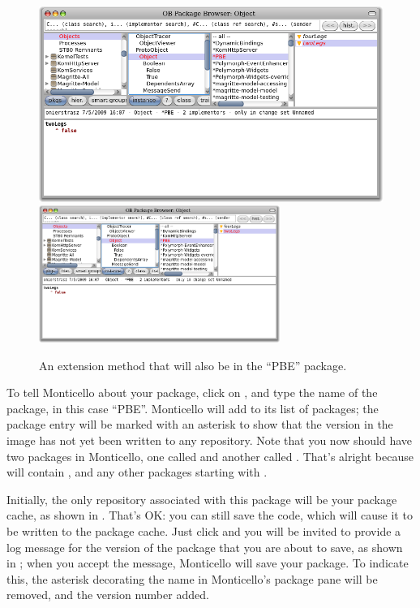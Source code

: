 \documentclass[a4paper,10pt,twoside]{book}
\begin{document}
\begin{figure}[btp]
	\begin{center}
	\ifluluelse
		{\includegraphics[width=\textwidth]{MCnewmethod}}
		{\includegraphics[width=0.7\textwidth]{MCnewmethod}}
	\end{center}
	\caption{An extension method that will also be in the ``PBE'' package.}
\end{figure}

To tell Monticello about your package, click on , and type the name of the package, in this case ``PBE''.  Monticello will add  to its list of packages; the package entry will be marked with an asterisk to show that the version in the image has not yet been written to any repository. Note that you now should have two packages in Monticello, one called  and another called . That's alright because  will contain , and any other packages starting with .

Initially, the only repository associated with this package will be your package cache, as shown in .  That's OK: you can still save the code, which will cause it to be written to the package cache.  
Just click  and you will be invited to provide a log message for the version of the package that you are about to save, as shown in ; when you accept the message, Monticello will save your package.
To indicate this, the asterisk decorating the name in Monticello's package pane will be removed, and the version number added.
\end{document}
